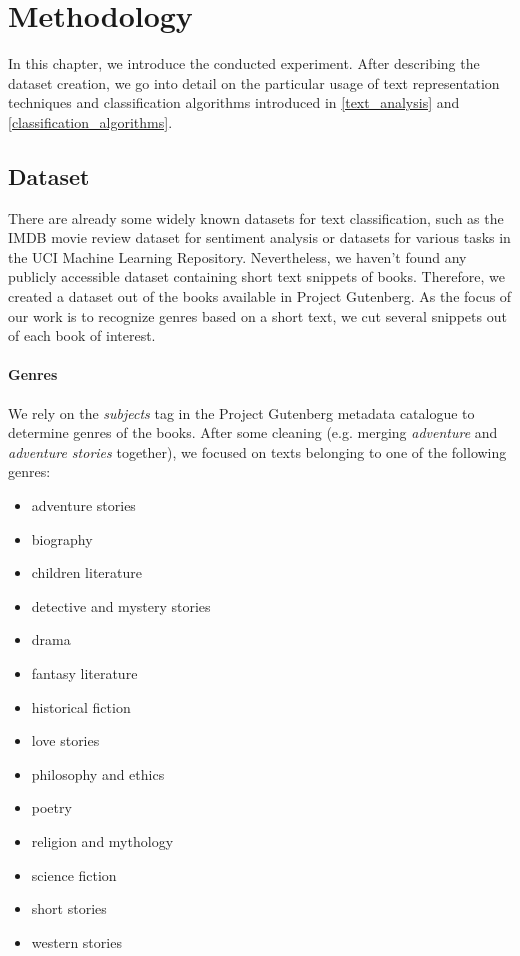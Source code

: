 \chapter{Methodology}
In this chapter, we introduce the conducted experiment. After describing the dataset creation, we go into detail on the particular usage of text representation techniques and classification algorithms introduced in \cref{text_analysis} and \cref{classification_algorithms}.

\section{Dataset}
There are already some widely known datasets for text classification, such as the IMDB movie review dataset for sentiment analysis\cite{imdb_dataset} or datasets for various tasks in the UCI Machine Learning Repository\cite{UCI}. Nevertheless, we haven't found any publicly accessible dataset containing short text snippets of books. Therefore, we created a dataset out of the books available in Project Gutenberg. As the focus of our work is to recognize genres based on a short text, we cut several snippets out of each book of interest.

\subsubsection{Genres}
We rely on the \textit{subjects} tag in the Project Gutenberg metadata catalogue to determine genres of the books. After some cleaning (e.g. merging \textit{adventure} and \textit{adventure stories} together), we focused on texts belonging to one of the following genres:
\begin{itemize}
  \item adventure stories
  \item biography
  \item children literature
  \item detective and mystery stories
  \item drama
  \item fantasy literature
  \item historical fiction
  \item love stories
  \item philosophy and ethics
  \item poetry
  \item religion and mythology
  \item science fiction
  \item short stories
  \item western stories
\end{itemize}

